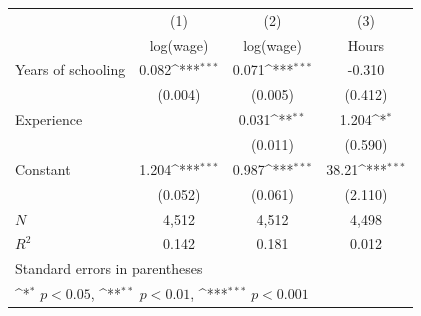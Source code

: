 {
\def\sym#1{\ifmmode^{#1}\else\(^{#1}\)\fi}
\begin{tabular}{l*{3}{c}}
\toprule
                    &\multicolumn{1}{c}{(1)}&\multicolumn{1}{c}{(2)}&\multicolumn{1}{c}{(3)}\\
                    &\multicolumn{1}{c}{log(wage)}&\multicolumn{1}{c}{log(wage)}&\multicolumn{1}{c}{Hours}\\
\midrule
Years of schooling  &       0.082\sym{***}&       0.071\sym{***}&      -0.310         \\
                    &     (0.004)         &     (0.005)         &     (0.412)         \\
\addlinespace
Experience          &                     &       0.031\sym{**} &       1.204\sym{*}  \\
                    &                     &     (0.011)         &     (0.590)         \\
\addlinespace
Constant            &       1.204\sym{***}&       0.987\sym{***}&      38.21\sym{***} \\
                    &     (0.052)         &     (0.061)         &     (2.110)         \\
\midrule
\(N\)               &        4,512        &        4,512        &        4,498        \\
\(R^{2}\)           &       0.142         &       0.181         &       0.012         \\
\bottomrule
\multicolumn{4}{l}{\footnotesize Standard errors in parentheses}\\
\multicolumn{4}{l}{\footnotesize \sym{*} \(p<0.05\), \sym{**} \(p<0.01\), \sym{***} \(p<0.001\)}\\
\end{tabular}
}
